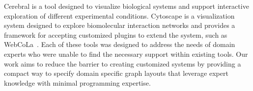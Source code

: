 Cerebral \cite{barsky2008cerebral} is a tool designed to visualize
biological systems and support interactive exploration of different
experimental conditions. Cytoscape \cite{shannon2003cytoscape} is a
visualization system designed to explore biomolecular interaction networks
and provides a framework for accepting customized plugins to extend the
system, such as WebCoLa~\cite{WebCoLa}. Each of these tools was designed to
address the needs of domain experts who were unable to find the necessary
support within existing tools. Our work aims to reduce the barrier to
creating customized systems by providing a compact way to specify domain
specific graph layouts that leverage expert knowledge with minimal
programming expertise.





